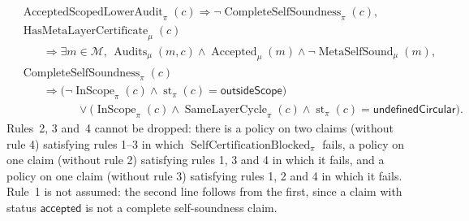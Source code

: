 \begin{theorem}
\begin{align*}
  &\operatorname{AcceptedScopedLowerAudit}_{\pi}(c)
    \Longrightarrow
    \neg\operatorname{CompleteSelfSoundness}_{\pi}(c),\\
  &\operatorname{HasMetaLayerCertificate}_{\mu}(c)\\
  &\qquad{}\Longrightarrow
    \exists m\in\mathcal M,\,
      \operatorname{Audits}_{\mu}(m,c)
      \wedge\operatorname{Accepted}_{\mu}(m)
      \wedge
      \neg\operatorname{MetaSelfSound}_{\mu}(m),\\
  &\operatorname{CompleteSelfSoundness}_{\pi}(c)\\
  &\qquad{}\Longrightarrow
    \bigl(\neg\operatorname{InScope}_{\pi}(c)
      \wedge\operatorname{st}_{\pi}(c)=\mathsf{outsideScope}\bigr)\\
  &\hspace{5em}\vee
    \bigl(\operatorname{InScope}_{\pi}(c)
      \wedge\operatorname{SameLayerCycle}_{\pi}(c)
      \wedge\operatorname{st}_{\pi}(c)=\mathsf{undefinedCircular}\bigr).
\end{align*}
Rules~2, 3 and~4 cannot be dropped: there is a policy on two claims (without rule 4) satisfying
rules 1--3 in which \(\operatorname{SelfCertificationBlocked}_{\pi}\) fails,
a policy on one claim (without rule 2) satisfying rules 1, 3 and 4 in which it fails, and a
policy on one claim (without rule 3) satisfying rules 1, 2 and 4 in which it fails. Rule~1 is not assumed: the second line follows from the first, since a claim with status \(\mathsf{accepted}\) is not a complete self-soundness claim.
\end{theorem}
